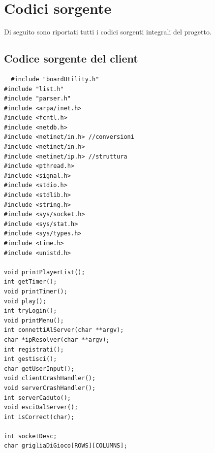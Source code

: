 \documentclass[a4paper]{article}
\begin{document}
\section{Codici sorgente}
Di seguito sono riportati tutti i codici sorgenti integrali del progetto.
\subsection{Codice sorgente del client}
\begin{lstlisting}
  #include "boardUtility.h"
#include "list.h"
#include "parser.h"
#include <arpa/inet.h>
#include <fcntl.h>
#include <netdb.h>
#include <netinet/in.h> //conversioni
#include <netinet/in.h>
#include <netinet/ip.h> //struttura
#include <pthread.h>
#include <signal.h>
#include <stdio.h>
#include <stdlib.h>
#include <string.h>
#include <sys/socket.h>
#include <sys/stat.h>
#include <sys/types.h>
#include <time.h>
#include <unistd.h>

void printPlayerList();
int getTimer();
void printTimer();
void play();
int tryLogin();
void printMenu();
int connettiAlServer(char **argv);
char *ipResolver(char **argv);
int registrati();
int gestisci();
char getUserInput();
void clientCrashHandler();
void serverCrashHandler();
int serverCaduto();
void esciDalServer();
int isCorrect(char);

int socketDesc;
char grigliaDiGioco[ROWS][COLUMNS];


\end{lstlisting}
\end{document}
